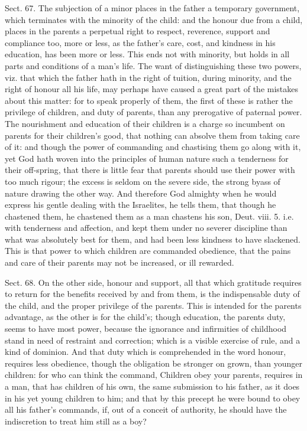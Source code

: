 \documentclass[11pt,openany]{book}
\begin{document}
Sect. 67. The subjection of a minor places in the father a temporary government, which terminates with the minority of the child: and the honour due from a child, places in the parents a perpetual right to respect, reverence, support and compliance too, more or less, as the father's care, cost, and kindness in his education, has been more or less. This ends not with minority, but holds in all parts and conditions of a man's life. The want of distinguishing these two powers, viz. that which the father hath in the right of tuition, during minority, and the right of honour all his life, may perhaps have caused a great part of the mistakes about this matter: for to speak properly of them, the first of these is rather the privilege of children, and duty of parents, than any prerogative of paternal power. The nourishment and education of their children is a charge so incumbent on parents for their children's good, that nothing can absolve them from taking care of it: and though the power of commanding and chastising them go along with it, yet God hath woven into the principles of human nature such a tenderness for their off-spring, that there is little fear that parents should use their power with too much rigour; the excess is seldom on the severe side, the strong byass of nature drawing the other way. And therefore God almighty when he would express his gentle dealing with the Israelites, he tells them, that though he chastened them, he chastened them as a man chastens his son, Deut. viii. 5. i.e. with tenderness and affection, and kept them under no severer discipline than what was absolutely best for them, and had been less kindness to have slackened. This is that power to which children are commanded obedience, that the pains and care of their parents may not be increased, or ill rewarded.

Sect. 68. On the other side, honour and support, all that which gratitude requires to return for the benefits received by and from them, is the indispensable duty of the child, and the proper privilege of the parents. This is intended for the parents advantage, as the other is for the child's; though education, the parents duty, seems to have most power, because the ignorance and infirmities of childhood stand in need of restraint and correction; which is a visible exercise of rule, and a kind of dominion. And that duty which is comprehended in the word honour, requires less obedience, though the obligation be stronger on grown, than younger children: for who can think the command, Children obey your parents, requires in a man, that has children of his own, the same submission to his father, as it does in his yet young children to him; and that by this precept he were bound to obey all his father's commands, if, out of a conceit of authority, he should have the indiscretion to treat him still as a boy?
\end{document}
